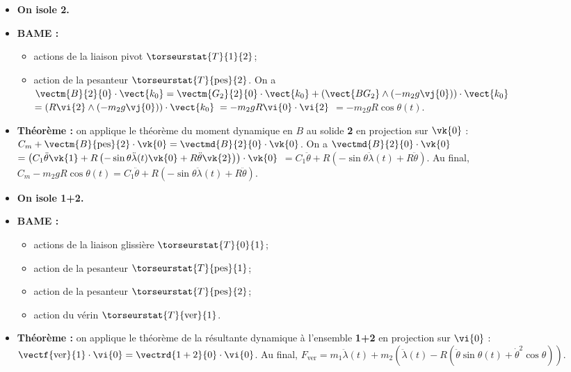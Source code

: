 \ifprof
\begin{itemize}
\item \textbf{On isole 2.}
\item \textbf{BAME :}
\begin{itemize}
\item actions de la liaison pivot $\torseurstat{T}{1}{2}$; 
\item action de la pesanteur $\torseurstat{T}{\text{pes}}{2}$. On a $\vectm{B}{2}{0}\cdot \vect{k_0}=\vectm{G_2}{2}{0}\cdot \vect{k_0}+\left(\vect{BG_2}\wedge \left( -m_2 g \vj{0} \right) \right)\cdot \vect{k_0}$ $=\left(R\vi{2}\wedge \left( -m_2 g \vj{0} \right) \right)\cdot \vect{k_0}$
$=-m_2 g R  \vi{0}\cdot \vi{2} $ $=-m_2 g R  \cos\theta(t) $.
\end{itemize}
\item \textbf{Théorème :} on applique le théorème du moment dynamique en $B$ au solide \textbf{2} en projection sur $\vk{0}$ : $C_m+\vectm{B}{\text{pes}}{2}\cdot \vk{0}  = \vectmd{B}{2}{0}\cdot \vk{0}$.
On  a $ \vectmd{B}{2}{0}\cdot \vk{0}$ $=\left(C_1  \ddot{\theta} \vk{1} + R\left( -\sin \theta \ddot{\lambda}(t) \vk{0} 
+ R \ddot{\theta} \vk{2}\right) \right) \cdot \vk{0}$
 $=C_1  \ddot{\theta} + R\left( -\sin \theta \ddot{\lambda}(t) + R \ddot{\theta} \right)  $. Au final, 
 $ C_m-m_2 g R  \cos\theta(t) = C_1  \ddot{\theta} + R\left( -\sin \theta \ddot{\lambda}(t) + R \ddot{\theta} \right)$.
\end{itemize}




\else
\fi

\ifprof
\begin{itemize}
\item \textbf{On isole 1+2.}
\item \textbf{BAME :}
\begin{itemize}
\item actions de la liaison glissière $\torseurstat{T}{0}{1}$;
\item action de la pesanteur $\torseurstat{T}{\text{pes}}{1}$;
\item action de la pesanteur $\torseurstat{T}{\text{pes}}{2}$;
\item action du vérin $\torseurstat{T}{\text{ver}}{1}$.
\end{itemize}
\item \textbf{Théorème :} on applique le théorème de la résultante dynamique à l'ensemble \textbf{1+2} en projection sur 
$\vi{0}$ : 
$\vectf{\text{ver}}{1}\cdot \vi{0}  = \vectrd{1+2}{0}\cdot \vi{0}$. Au final, 
$F_{\text{ver}}=m_1\ddot{\lambda}(t)+m_2\left(\ddot{\lambda}(t)- R \left(\ddot{\theta} \sin\theta(t)  + \dot{\theta}^2 \cos\theta \right)\right)$.
\end{itemize}
\else
\fi


